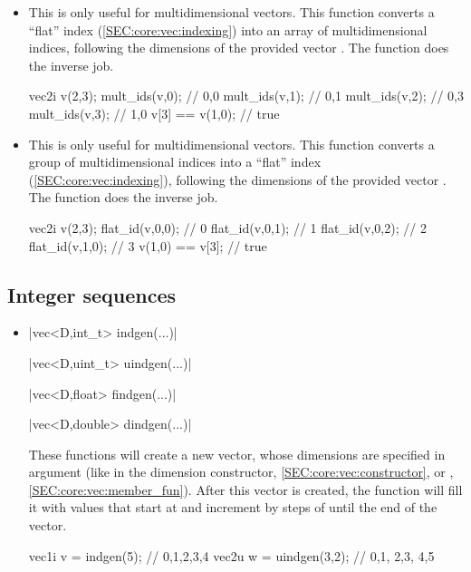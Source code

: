 \documentclass[12pt]{report}
\newenvironment{example}
{
    \begin{mdframed}[style=example,frametitle={Example}]
}
{
    \end{mdframed}
}
\begin{document}
\begin{itemize}
\item {} 

This is only useful for multidimensional vectors. This function converts a ``flat'' index  (\ref{SEC:core:vec:indexing}) into an array of multidimensional indices, following the dimensions of the provided vector . The  function does the inverse job.

\begin{example}
\begin{cppcode}
vec2i v(2,3);
mult_ids(v,0); // {0,0}
mult_ids(v,1); // {0,1}
mult_ids(v,2); // {0,3}
mult_ids(v,3); // {1,0}
v[3] == v(1,0); // true
\end{cppcode}
\end{example}

\item {} 

This is only useful for multidimensional vectors. This function converts a group of multidimensional indices into a ``flat'' index (\ref{SEC:core:vec:indexing}), following the dimensions of the provided vector . The  function does the inverse job.

\begin{example}
\begin{cppcode}
vec2i v(2,3);
flat_id(v,0,0); // 0
flat_id(v,0,1); // 1
flat_id(v,0,2); // 2
flat_id(v,1,0); // 3
v(1,0) == v[3]; // true
\end{cppcode}
\end{example}
\end{itemize}

\subsection{Integer sequences}

\begin{itemize}
\item \cppinline|vec<D,int_t>  indgen(...)| 

\cppinline|vec<D,uint_t> uindgen(...)| 

\cppinline|vec<D,float>  findgen(...)| 

\cppinline|vec<D,double> dindgen(...)| 

These functions will create a new vector, whose dimensions are specified in argument (like in the dimension constructor, \ref{SEC:core:vec:constructor}, or , \ref{SEC:core:vec:member_fun}). After this vector is created, the function will fill it with values that start at  and increment by steps of  until the end of the vector.

\begin{example}
\begin{cppcode}
vec1i v = indgen(5);    // {0,1,2,3,4}
vec2u w = uindgen(3,2); // {{0,1}, {2,3}, {4,5}}
\end{cppcode}
\end{example}
\end{itemize}
\end{document}

